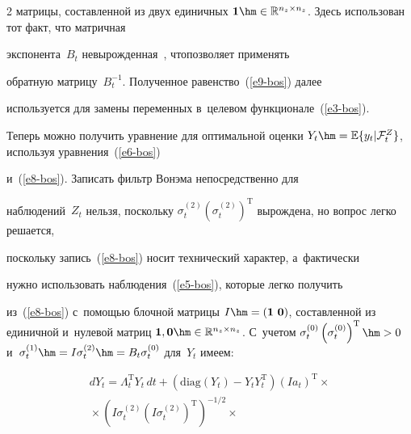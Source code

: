 \begin{multicols}{2}
матрицы, составленной из двух единичных $\mathbf{1}\hm\in 


\mathbb{R}^{n_z\times n_z}$. Здесь использован тот факт, что мат\-рич\-ная 


экспонента~$B_t$ невырожденная~\cite{14-bos}, что\linebreak позволяет применять 


обратную мат\-ри\-цу~$B_t^{-1}$. Полученное равенство~(\ref{e9-bos}) далее 


используется для замены переменных в~целевом функционале~(\ref{e3-bos}).





     Теперь можно получить уравнение для оптимальной оценки $Y_t\hm= 


\mathbb{E}\{ y_t\vert \mathcal{F}_t^Z\}$, используя уравнения~(\ref{e6-bos}) 


и~(\ref{e8-bos}). Записать фильтр Вонэма непосредственно для 


наблюдений~$Z_t$ нельзя, поскольку $\sigma_t^{(2)} 


\left(\sigma_t^{(2)}\right)^{\mathrm{T}}$ вырождена, но вопрос легко решается, 


поскольку запись~(\ref{e8-bos}) носит технический характер, а~фактически 


нужно использовать наблюдения~(\ref{e5-bos}), которые легко получить 


из~(\ref{e8-bos}) с~помощью блочной матрицы $I\hm= (\mathbf{1}\ 


\mathbf{0})$, составленной из единичной и~нулевой матриц $\mathbf{1}, 


\mathbf{0}\hm\in \mathbb{R}^{n_z\times n_z}$. С~учетом $\sigma_t^{(0)} 


\left( \sigma_t^{(0)}\right)^{\mathrm{T}}\hm>0$ и~$\sigma_t^{(1)}\hm= I\sigma_t^{(2)} 


\hm= B_t\sigma_t^{(0)}$ для~$Y_t$ имеем:


     \begin{multline*}


     dY_t=\Lambda_t^{\mathrm{T}} Y_t\,dt +\left( \mathrm{diag} \left(Y_t\right)-Y_t Y_t^{\mathrm{T}}\right) 


\left(Ia_t\right)^{\mathrm{T}}\times{}\\


{}\times \left( I\sigma_t^{(2)} \left(I\sigma_t^{(2)}\right)^{\mathrm{T}}  


\right)^{-1/2}\times{}\\



\end{multline*}
\end{multicols}
